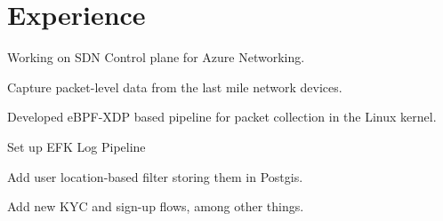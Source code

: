 \documentclass[letterpaper]{deedy-resume} %
\begin{document}
\begin{minipage}[t]{0.66\textwidth} %


\section{Experience}


\vspace{\topsep} %
\begin{tightitemize}
\item Working on SDN Control plane for Azure Networking.
\end{tightitemize}

\sectionspace %

\begin{tightitemize}
\item Capture packet-level data from the last mile network devices.
\item Developed eBPF-XDP based pipeline for packet collection in the Linux kernel.
\end{tightitemize}

\sectionspace %


\begin{tightitemize}
\item Set up EFK Log Pipeline
\item Add user location-based filter storing them in Postgis.
\item Add new KYC and sign-up flows, among other things.
\end{tightitemize}


\end{minipage}
\end{document}
